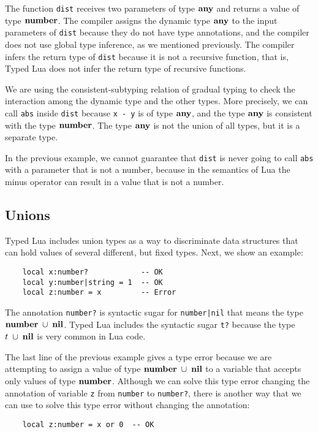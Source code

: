 The function \texttt{dist} receives two parameters of type $\mathbf{any}$
and returns a value of type $\mathbf{number}$.
The compiler assigns the dynamic type $\mathbf{any}$ to the input
parameters of \texttt{dist} because they do not have type annotations,
and the compiler does not use global type inference, as we mentioned
previously.
The compiler infers the return type of \texttt{dist} because it is
not a recursive function, that is, Typed Lua does not infer the return
type of recursive functions.

We are using the consistent-subtyping relation of gradual
typing to check the interaction among the dynamic type and the other
types.
More precisely, we can call \texttt{abs} inside \texttt{dist} because
\texttt{x - y} is of type $\mathbf{any}$, and the type $\mathbf{any}$ is
consistent with the type $\mathbf{number}$.
The type $\mathbf{any}$ is not the union of all types, but it is a separate
type.

In the previous example, we cannot guarantee that \texttt{dist} is never
going to call \texttt{abs} with a parameter that is not a number,
because in the semantics of Lua the minus operator can result in a
value that is not a number.

\subsection{Unions}

Typed Lua includes union types as a way to discriminate data
structures that can hold values of several different, but fixed types.
Next, we show an example:
\begin{verbatim}
    local x:number?            -- OK
    local y:number|string = 1  -- OK
    local z:number = x         -- Error
\end{verbatim}

The annotation \texttt{number?} is syntactic sugar for
\texttt{number|nil} that means the type $\mathbf{number}\;\cup\;\mathbf{nil}$.
Typed Lua includes the syntactic sugar \texttt{t?} because the
type $t\;\cup\;\mathbf{nil}$ is very common in Lua code.

The last line of the previous example gives a type error because we
are attempting to assign a value of type $\mathbf{number}\;\cup\;\mathbf{nil}$
to a variable that accepts only values of type $\mathbf{number}$.
Although we can solve this type error changing the annotation of
variable \texttt{z} from \texttt{number} to \texttt{number?}, there is
another way that we can use to solve this type error without changing
the annotation:
\begin{verbatim}
    local z:number = x or 0  -- OK
\end{verbatim}

